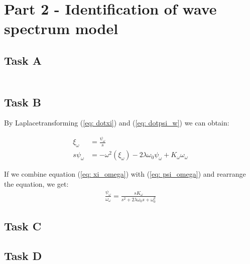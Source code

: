 \section{Part 2 - Identification of wave spectrum model}
\subsection{Task A}

\begin{equations}
    \begin{align}
        
    \end{align}
\end{equations}
\subsection{Task B}
By Laplacetransforming (\ref{eq: dotxi}) and (\ref{eq: dotpsi_w}) we can obtain:
\begin{equations}
    \begin{align}
        \xi_\omega &= \frac{\psi_\omega}{s} \label{eq: xi_omega}\\
        s\psi_\omega &= -\omega^2(\xi_\omega) -2\lambda\omega_0\psi_\omega + K_\omega\omega_\omega \label{eq: psi_omega}
    \end{align}
\end{equations}
\newline
If we combine equation (\ref{eq: xi_omega}) with (\ref{eq: psi_omega}) and rearrange the equation, we get:
\begin{equation}
    \begin{align}
        \frac{\psi_\omega}{\omega_\omega} = \frac{sK_\omega}{s^2 + 2\lambda\omega_0s + \omega_0^2}
    \end{align}
\end{equation}
\subsection{Task C}
\subsection{Task D}